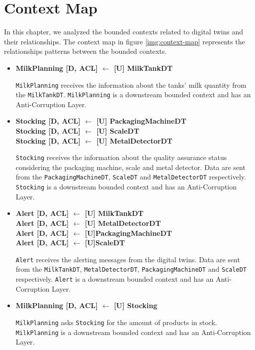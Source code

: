 \chapter{Context Map}
In this chapter, we analyzed the bounded contexts related to digital twins and their relationships.
The context map in figure \ref{img:context-map} represents the relationships patterns between the bounded contexts.

\begin{itemize}
    \item \textbf{MilkPlanning [D, ACL] $\leftarrow$ [U] MilkTankDT}
    
    \texttt{MilkPlanning} receives the information about the tanks' milk quantity from the \texttt{MilkTankDT}.
    \texttt{MilkPlanning} is a downstream bounded context and has an Anti-Corruption Layer.
    
    \item \textbf{Stocking [D, ACL] $\leftarrow$ [U] PackagingMachineDT \\ 
    Stocking [D, ACL] $\leftarrow$ [U] ScaleDT \\ 
    Stocking [D, ACL] $\leftarrow$ [U] MetalDetectorDT}

    \texttt{Stocking} receives the information about the quality assurance status considering the packaging machine, scale and metal detector. Data are sent from the \texttt{PackagingMachineDT}, \texttt{ScaleDT} and \texttt{MetalDetectorDT} respectively.
    \texttt{Stocking} is a downstream bounded context and has an Anti-Corruption Layer.
	
	\item \textbf{Alert [D, ACL] $\leftarrow$ [U] MilkTankDT \\
	Alert [D, ACL] $\leftarrow$ [U] MetalDetectorDT \\
	Alert [D, ACL] $\leftarrow$ [U]PackagingMachineDT \\
	Alert [D, ACL] $\leftarrow$ [U]ScaleDT}

    \texttt{Alert} receives the alerting messages from the digital twins. Data are sent from the \texttt{MilkTankDT}, \texttt{MetalDetectorDT}, \texttt{PackagingMachineDT} and \texttt{ScaleDT} respectively.
    \texttt{Alert} is a downstream bounded context and has an Anti-Corruption Layer.

    \item \textbf{MilkPlanning [D, ACL] $\leftarrow$  [U] Stocking} 
    
    \texttt{MilkPlanning} asks \texttt{Stocking} for the amount of products in stock.
    \texttt{MilkPlanning} is a downstream bounded context and has an Anti-Corruption Layer.


\end{itemize}

